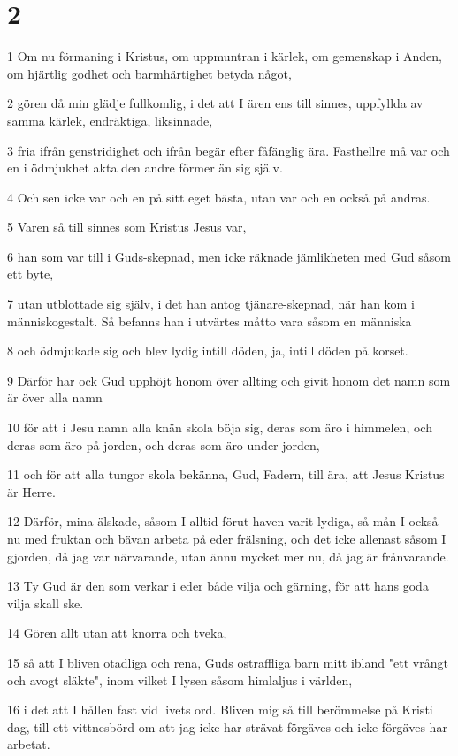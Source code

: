 \chapter{2}

\par 1 Om nu förmaning i Kristus, om uppmuntran i kärlek, om gemenskap i Anden, om hjärtlig godhet och barmhärtighet betyda något,
\par 2 gören då min glädje fullkomlig, i det att I ären ens till sinnes, uppfyllda av samma kärlek, endräktiga, liksinnade,
\par 3 fria ifrån genstridighet och ifrån begär efter fåfänglig ära. Fasthellre må var och en i ödmjukhet akta den andre förmer än sig själv.
\par 4 Och sen icke var och en på sitt eget bästa, utan var och en också på andras.
\par 5 Varen så till sinnes som Kristus Jesus var,
\par 6 han som var till i Guds-skepnad, men icke räknade jämlikheten med Gud såsom ett byte,
\par 7 utan utblottade sig själv, i det han antog tjänare-skepnad, när han kom i människogestalt. Så befanns han i utvärtes måtto vara såsom en människa
\par 8 och ödmjukade sig och blev lydig intill döden, ja, intill döden på korset.
\par 9 Därför har ock Gud upphöjt honom över allting och givit honom det namn som är över alla namn
\par 10 för att i Jesu namn alla knän skola böja sig, deras som äro i himmelen, och deras som äro på jorden, och deras som äro under jorden,
\par 11 och för att alla tungor skola bekänna, Gud, Fadern, till ära, att Jesus Kristus är Herre.
\par 12 Därför, mina älskade, såsom I alltid förut haven varit lydiga, så mån I också nu med fruktan och bävan arbeta på eder frälsning, och det icke allenast såsom I gjorden, då jag var närvarande, utan ännu mycket mer nu, då jag är frånvarande.
\par 13 Ty Gud är den som verkar i eder både vilja och gärning, för att hans goda vilja skall ske.
\par 14 Gören allt utan att knorra och tveka,
\par 15 så att I bliven otadliga och rena, Guds ostraffliga barn mitt ibland "ett vrångt och avogt släkte", inom vilket I lysen såsom himlaljus i världen,
\par 16 i det att I hållen fast vid livets ord. Bliven mig så till berömmelse på Kristi dag, till ett vittnesbörd om att jag icke har strävat förgäves och icke förgäves har arbetat.
